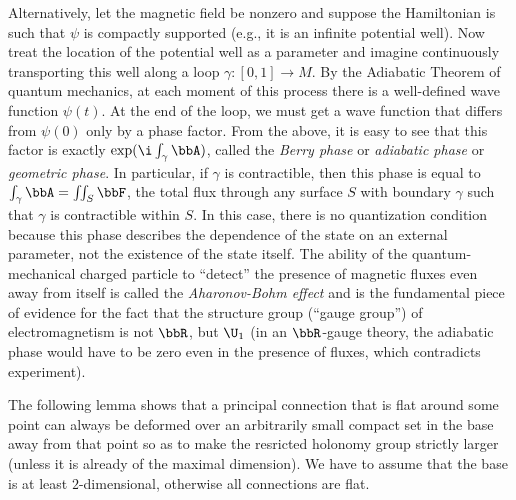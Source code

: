 \begin{example}
    Alternatively, let the magnetic field be nonzero and suppose the Hamiltonian is such that $\psi$ is compactly supported (e.g., it is an infinite potential well). Now treat the location of the potential well as a parameter and imagine continuously transporting this well along a loop $\gamma:[0,1]\to M$. By the Adiabatic Theorem of quantum mechanics, at each moment of this process there is a well-defined wave function $\psi(t)$. At the end of the loop, we must get a wave function that differs from $\psi(0)$ only by a phase factor. From the above, it is easy to see that this factor is exactly $\exp(\i\int_\gamma \bbA)$, called the \emph{Berry phase} or \emph{adiabatic phase} or \emph{geometric phase}. In particular, if $\gamma$ is contractible, then this phase is equal to $\int_\gamma\bbA=\iint_S \bbF$, the total flux through any surface $S$ with boundary $\gamma$ such that $\gamma$ is contractible within $S$. In this case, there is no quantization condition because this phase describes the dependence of the state on an external parameter, not the existence of the state itself. The ability of the quantum-mechanical charged particle to ``detect'' the presence of magnetic fluxes even away from itself is called the \emph{Aharonov-Bohm effect} and is the fundamental piece of evidence for the fact that the structure group (``gauge group'') of electromagnetism is not $\bbR$, but $\U_1$ (in an $\bbR$-gauge theory, the adiabatic phase would have to be zero even in the presence of fluxes, which contradicts experiment).

\end{example}

The following lemma shows that a principal connection that is flat around some point can always be deformed over an arbitrarily small compact set in the base away from that point so as to make the resricted holonomy group strictly larger (unless it is already of the maximal dimension). We have to assume that the base is at least $2$-dimensional, otherwise all connections are flat.


